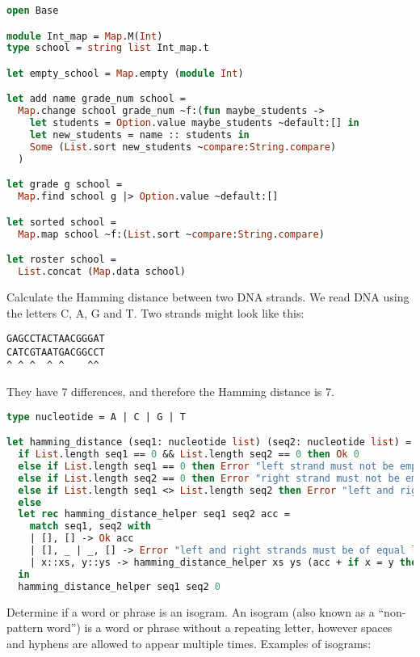 \begin{lstlisting}[language=OCaml]
open Base

module Int_map = Map.M(Int)
type school = string list Int_map.t

let empty_school = Map.empty (module Int)

let add name grade_num school =
  Map.change school grade_num ~f:(fun maybe_students ->
    let students = Option.value maybe_students ~default:[] in
    let new_students = name :: students in
    Some (List.sort new_students ~compare:String.compare)
  )

let grade g school =
  Map.find school g |> Option.value ~default:[]

let sorted school =
  Map.map school ~f:(List.sort ~compare:String.compare)

let roster school =
  List.concat (Map.data school)
\end{lstlisting}

Calculate the Hamming distance between two DNA strands.
We read DNA using the letters C, A, G and T.
Two strands might look like this:
\begin{verbatim}
GAGCCTACTAACGGGAT
CATCGTAATGACGGCCT
^ ^ ^  ^ ^    ^^
\end{verbatim}
They have 7 differences, and therefore the Hamming distance is 7.

\begin{lstlisting}[language=OCaml]
type nucleotide = A | C | G | T

let hamming_distance (seq1: nucleotide list) (seq2: nucleotide list) =
  if List.length seq1 == 0 && List.length seq2 == 0 then Ok 0
  else if List.length seq1 == 0 then Error "left strand must not be empty"
  else if List.length seq2 == 0 then Error "right strand must not be empty"
  else if List.length seq1 <> List.length seq2 then Error "left and right strands must be of equal length"
  else
  let rec hamming_distance_helper seq1 seq2 acc = 
    match seq1, seq2 with
    | [], [] -> Ok acc
    | [], _ | _, [] -> Error "left and right strands must be of equal length"
    | x::xs, y::ys -> hamming_distance_helper xs ys (acc + if x = y then 0 else 1)
  in
  hamming_distance_helper seq1 seq2 0
\end{lstlisting}

Determine if a word or phrase is an isogram.
An isogram (also known as a ``non-pattern word'') is a word or phrase without a repeating letter, however spaces and hyphens are allowed to appear multiple times.
Examples of isograms:


